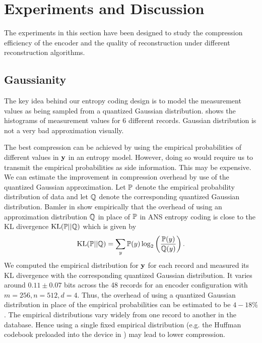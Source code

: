 \section{Experiments and Discussion}
\label{sec:results}
The experiments in this section have been
designed to study the compression efficiency
of the encoder and the quality of reconstruction
under different reconstruction algorithms.


\subsection{Gaussianity}

The key idea behind our entropy coding
design is to model the measurement values as
being sampled from a quantized Gaussian distribution.
 shows the histograms of measurement
values for 6 different records.
Gaussian distribution is not a very bad approximation visually.

The best compression can be achieved by using the empirical
probabilities of different values in $\mathbf{y}$ in an entropy model.
However, doing so would require us to transmit the empirical
probabilities as side information. This may be expensive.
We can estimate the improvement in compression overhead
by use of the quantized Gaussian approximation.
Let $\mathbb{P}$ denote the empirical probability distribution
of data and let $\mathbb{Q}$ denote the corresponding
quantized Gaussian distribution. Bamler in \cite{bamler2022constriction}
show empirically that the overhead of using an approximation
distribution $\mathbb{Q}$ in place of $\mathbb{P}$ in ANS entropy coding
is close to the KL divergence $\text{KL}(\mathbb{P} || \mathbb{Q})$
which is given by
\begin{equation}
\text{KL}(\mathbb{P} || \mathbb{Q}) = \sum_y \mathbb{P}(y) \log_2\left (\frac{\mathbb{P}(y)}{\mathbb{Q}(y)} \right).
\end{equation}
We computed the empirical distribution for $\mathbf{y}$ for each
record and measured its KL divergence with the corresponding
quantized Gaussian distribution.
It varies around $0.11 \pm 0.07$ bits across the 48 records
for an encoder configuration with $m=256,n=512,d=4$.
Thus, the overhead of using a quantized
Gaussian distribution in place of the empirical probabilities
can be estimated to be $4-18\%$.
The empirical distributions vary widely from one record to another
in the database. Hence using a single fixed empirical distribution
(e.g. the Huffman codebook preloaded into the device in
\cite{mamaghanian2011compressed})
may lead to lower compression.

